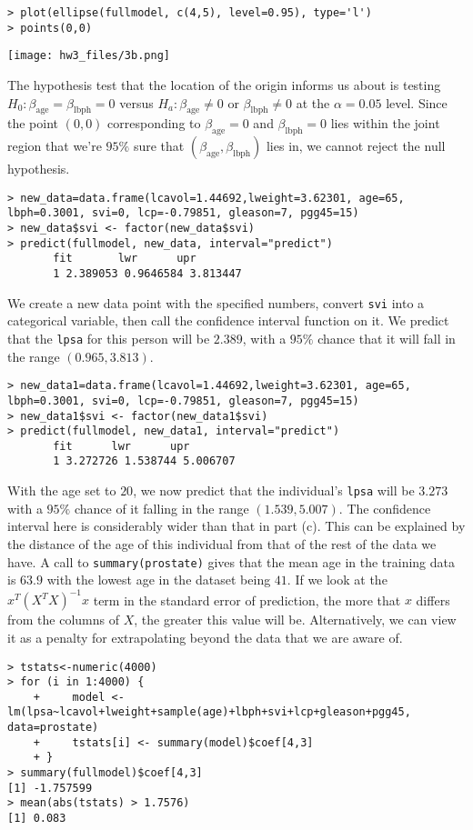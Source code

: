 \documentclass{article}
\begin{document}
\begin{verbatim}
> plot(ellipse(fullmodel, c(4,5), level=0.95), type='l')
> points(0,0)
\end{verbatim}

\texttt{[image: hw3\_files/3b.png]}

The hypothesis test that the location of the origin informs us about is testing $H_0:\beta_\text{age}=\beta_\text{lbph}=0$ versus $H_a:\beta_\text{age}\neq0\text{ or }\beta_\text{lbph}\neq0$ at the $\alpha=0.05$ level. Since the point $(0,0)$ corresponding to $\beta_\text{age}=0$ and $\beta_\text{lbph}=0$ lies within the joint region that we're $95\%$ sure that $(\beta_\text{age},\beta_\text{lbph})$ lies in, we cannot reject the null hypothesis.
\begin{verbatim}
> new_data=data.frame(lcavol=1.44692,lweight=3.62301, age=65, lbph=0.3001, svi=0, lcp=-0.79851, gleason=7, pgg45=15)
> new_data$svi <- factor(new_data$svi)
> predict(fullmodel, new_data, interval="predict")
       fit       lwr      upr
       1 2.389053 0.9646584 3.813447
\end{verbatim}

We create a new data point with the specified numbers, convert \verb|svi| into a categorical variable, then call the confidence interval function on it. We predict that the \verb|lpsa| for this person will be $2.389$, with a $95\%$ chance that it will fall in the range $(0.965,3.813)$.
\begin{verbatim}
> new_data1=data.frame(lcavol=1.44692,lweight=3.62301, age=65, lbph=0.3001, svi=0, lcp=-0.79851, gleason=7, pgg45=15)
> new_data1$svi <- factor(new_data1$svi)
> predict(fullmodel, new_data1, interval="predict")
       fit      lwr      upr
       1 3.272726 1.538744 5.006707
\end{verbatim}

With the age set to $20$, we now predict that the individual's \verb|lpsa| will be $3.273$ with a $95\%$ chance of it falling in the range $(1.539, 5.007)$. The confidence interval here is considerably wider than that in part (c). This can be explained by the distance of the age of this individual from that of the rest of the data we have. A call to \verb|summary(prostate)| gives that the mean age in the training data is $63.9$ with the lowest age in the dataset being $41$. If we look at the $x^T(X^TX)^{-1}x$ term in the standard error of prediction, the more that $x$ differs from the columns of $X$, the greater this value will be. Alternatively, we can view it as a penalty for extrapolating beyond the data that we are aware of.
\begin{verbatim}
> tstats<-numeric(4000)
> for (i in 1:4000) {
    +     model <- lm(lpsa~lcavol+lweight+sample(age)+lbph+svi+lcp+gleason+pgg45, data=prostate)
    +     tstats[i] <- summary(model)$coef[4,3]
    + }
> summary(fullmodel)$coef[4,3]
[1] -1.757599
> mean(abs(tstats) > 1.7576)
[1] 0.083
\end{verbatim}
\end{document}
